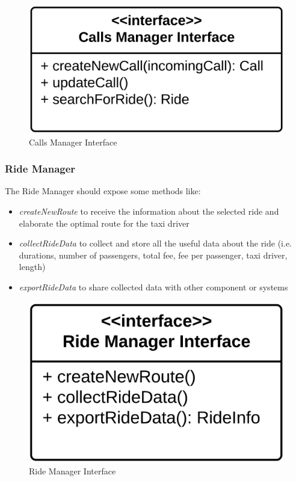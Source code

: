 \begin{figure}[htbp]
\centering
\includegraphics[width=\textwidth]{cpt/img/ComponentInterfacesCallManagerInterface}
\caption{Calls Manager Interface}
\end{figure}
\clearpage

\subsubsection{Ride Manager}
The Ride Manager should expose some methods like:
\begin{itemize}
	\item \textit{createNewRoute} to receive the information about the selected ride and elaborate the optimal route for the taxi driver
	\item \textit{collectRideData} to collect and store all the useful data about the ride (i.e. durations, number of passengers, total fee, fee per passenger, taxi driver, length)
	\item \textit{exportRideData} to share collected data with other component or systems
\end{itemize}

\begin{figure}[htbp]
\centering
\includegraphics[width=\textwidth]{cpt/img/ComponentInterfacesRideManagerInterface}
\caption{Ride Manager Interface}
\end{figure}
\clearpage

